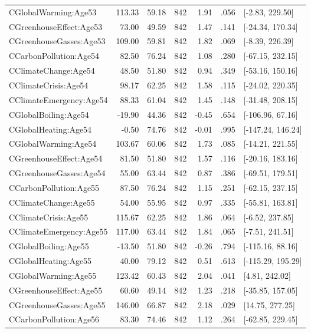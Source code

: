 \begin{table}[ht]
\begin{tabular}{lrrrrrl}
  CGlobalWarming:Age53 & 113.33 & 59.18 & 842 & 1.91 & .056 & [-2.83, 229.50] \\ 
  CGreenhouseEffect:Age53 & 73.00 & 49.59 & 842 & 1.47 & .141 & [-24.34, 170.34] \\ 
  CGreenhouseGasses:Age53 & 109.00 & 59.81 & 842 & 1.82 & .069 & [-8.39, 226.39] \\ 
  CCarbonPollution:Age54 & 82.50 & 76.24 & 842 & 1.08 & .280 & [-67.15, 232.15] \\ 
  CClimateChange:Age54 & 48.50 & 51.80 & 842 & 0.94 & .349 & [-53.16, 150.16] \\ 
  CClimateCrisis:Age54 & 98.17 & 62.25 & 842 & 1.58 & .115 & [-24.02, 220.35] \\ 
  CClimateEmergency:Age54 & 88.33 & 61.04 & 842 & 1.45 & .148 & [-31.48, 208.15] \\ 
  CGlobalBoiling:Age54 & -19.90 & 44.36 & 842 & -0.45 & .654 & [-106.96, 67.16] \\ 
  CGlobalHeating:Age54 & -0.50 & 74.76 & 842 & -0.01 & .995 & [-147.24, 146.24] \\ 
  CGlobalWarming:Age54 & 103.67 & 60.06 & 842 & 1.73 & .085 & [-14.21, 221.55] \\ 
  CGreenhouseEffect:Age54 & 81.50 & 51.80 & 842 & 1.57 & .116 & [-20.16, 183.16] \\ 
  CGreenhouseGasses:Age54 & 55.00 & 63.44 & 842 & 0.87 & .386 & [-69.51, 179.51] \\ 
  CCarbonPollution:Age55 & 87.50 & 76.24 & 842 & 1.15 & .251 & [-62.15, 237.15] \\ 
  CClimateChange:Age55 & 54.00 & 55.95 & 842 & 0.97 & .335 & [-55.81, 163.81] \\ 
  CClimateCrisis:Age55 & 115.67 & 62.25 & 842 & 1.86 & .064 & [-6.52, 237.85] \\ 
  CClimateEmergency:Age55 & 117.00 & 63.44 & 842 & 1.84 & .065 & [-7.51, 241.51] \\ 
  CGlobalBoiling:Age55 & -13.50 & 51.80 & 842 & -0.26 & .794 & [-115.16, 88.16] \\ 
  CGlobalHeating:Age55 & 40.00 & 79.12 & 842 & 0.51 & .613 & [-115.29, 195.29] \\ 
  CGlobalWarming:Age55 & 123.42 & 60.43 & 842 & 2.04 & .041 & [4.81, 242.02] \\ 
  CGreenhouseEffect:Age55 & 60.60 & 49.14 & 842 & 1.23 & .218 & [-35.85, 157.05] \\ 
  CGreenhouseGasses:Age55 & 146.00 & 66.87 & 842 & 2.18 & .029 & [14.75, 277.25] \\ 
  CCarbonPollution:Age56 & 83.30 & 74.46 & 842 & 1.12 & .264 & [-62.85, 229.45] \\ 

\end{tabular}
\end{table}
